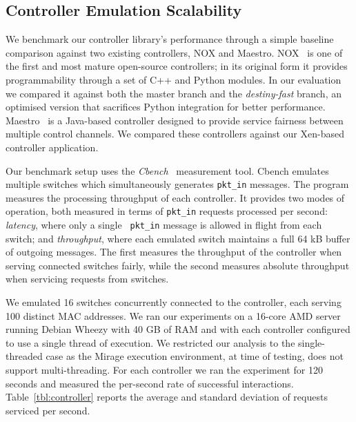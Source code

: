 \subsection{Controller Emulation Scalability} \label{sec:of-controller-perf}

We benchmark our controller library's performance through a simple baseline
comparison against two existing \of controllers, NOX and Maestro.
NOX~ is one of the first and most mature open-source \of controllers;
in its original form it provides programmability through a set of C++ and Python
modules.  In our evaluation we compared it against both the master branch and the
{\it destiny-fast} \/branch, an optimised version that sacrifices Python
integration for better performance.  Maestro~ is a Java-based
controller designed to provide service fairness between multiple \of control
channels.  We compared these controllers against our Xen-based \mirage \of
controller application.

Our benchmark setup uses the {\it Cbench}~ measurement tool. Cbench
emulates multiple switches which simultaneously generates {\tt pkt\_in}
messages.  The program measures the processing throughput of each controller.
It provides two modes of operation, both measured in terms of {\tt pkt\_in}
requests processed per second: {\it latency}, where only a single {\tt
  pkt\_in} message is allowed in flight from each switch; and {\it
  throughput}, where each emulated switch maintains a full 64 kB buffer of
outgoing messages. The first measures the throughput of the controller when
serving connected switches fairly, while the second measures absolute throughput
when servicing requests from switches.

We emulated 16 switches concurrently connected to the controller, each serving
100 distinct MAC addresses. We ran our experiments on a 16-core AMD server
running Debian Wheezy with 40 GB of RAM and with each controller configured to use a
single thread of execution. We restricted our analysis to the single-threaded case
as the Mirage execution environment, at time of testing, does not support
multi-threading. For each controller we ran the experiment for 120 seconds and
measured the per-second rate of successful interactions.
Table~\ref{tbl:controller} reports the average and standard deviation of
requests serviced per second.


